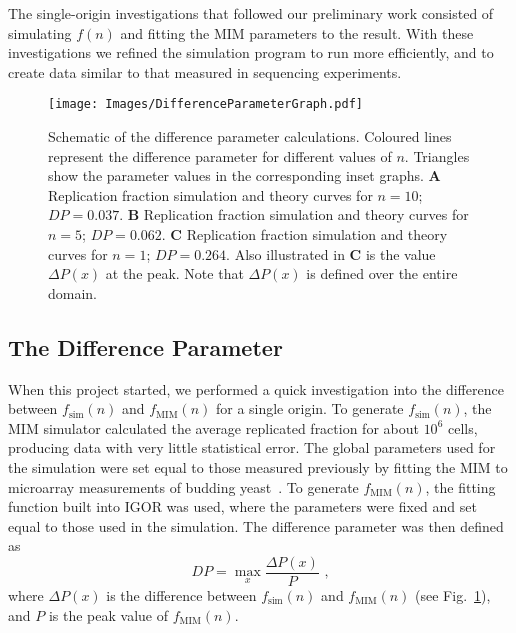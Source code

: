 	The single-origin investigations that followed our preliminary work consisted of simulating $f(n)$ and fitting the MIM parameters to the result.
	With these investigations we refined the simulation program to run more efficiently, and to create data similar to that measured in sequencing experiments.
		
	\begin{figure}[tbh!]
		\begin{center}
			\texttt{[image: Images/DifferenceParameterGraph.pdf]}
		\end{center}
			\caption[Difference Parameter]{\label{fig:DifferenceParameter} Schematic of the difference parameter calculations.
				Coloured lines represent the difference parameter for different values of $n$.
				Triangles show the parameter values in the corresponding inset graphs.
				\textbf{A} Replication fraction simulation and theory curves for $n=10$; $DP=0.037$.
				\textbf{B} Replication fraction simulation and theory curves for $n=5$; $DP = 0.062$.
				\textbf{C} Replication fraction simulation and theory curves for $n=1$; $DP = 0.264$.
				Also illustrated in \textbf{C} is the value $\Delta P(x)$ at the peak.
				Note that $\Delta P(x)$ is defined over the entire domain.
				}
	\end{figure}
	
	
		\subsection{The Difference Parameter}
		\label{subsec:earlywork}
		
		When this project started, we performed a quick investigation into the difference between $f_\text{sim}(n)$ and $f_\text{MIM}(n)$ for a single origin.
		To generate $f_\text{sim}(n)$, the MIM simulator calculated the average replicated fraction for about $10^6$ cells, producing data with very little statistical error.
		The global parameters used for the simulation were set equal to those measured previously by fitting the MIM to microarray measurements of budding yeast~\cite{ScottsPaper}.
		To generate $f_\text{MIM}(n)$, the fitting function built into IGOR was used, where the parameters were fixed and set equal to those used in the simulation.
		The difference parameter was then defined as
		\begin{equation} \label{DifferenceParameter}
			DP = \max_{x} {\frac {\Delta P(x)} {P}} \text{ ,}
		\end{equation}
		where $\Delta P(x)$ is the difference between $f_\text{sim}(n)$ and $f_\text{MIM}(n)$ (see Fig.~\ref{fig:DifferenceParameter}), and $P$ is the peak value of $f_\text{MIM}(n)$.
		
